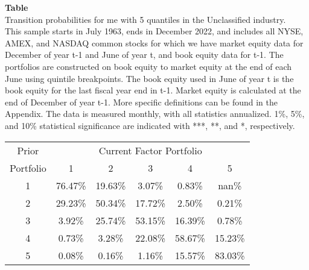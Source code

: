 \begin{table*}[ht!]
\raggedright
{}
\label{tab: transition_probs_me_Unclassified_with_5_quantiles}
\textbf{Table \thetable} \\
Transition probabilities for me with 5 quantiles in the Unclassified industry. \\
\hspace*{1em}This sample starts in July 1963, ends in December 2022, and includes all NYSE, AMEX, and NASDAQ common stocks for which we have market equity data for December of year t-1 and June of year t, and book equity data for t-1. The portfolios are constructed on book equity to market equity at the end of each June using quintile breakpoints.  The book equity used in June of year t is the book equity for the last fiscal year end in t-1.  Market equity is calculated at the end of December of year t-1.  More specific definitions can be found in the Appendix.  The data is measured monthly, with all statistics annualized.  1\%, 5\%, and 10\% statistical significance are indicated with ***, **, and *, respectively. \\
\vspace{0.5em}
\centering
\begin{adjustbox}{max width=\textwidth}
\begin{tabular}{@{}cccccc@{}}
\toprule
Prior & \multicolumn{5}{c}{Current Factor Portfolio} \\
Portfolio & 1 & 2 & 3 & 4 & 5 \\
\midrule
1 & 76.47\% & 19.63\% & 3.07\% & 0.83\% & nan\% \\
2 & 29.23\% & 50.34\% & 17.72\% & 2.50\% & 0.21\% \\
3 & 3.92\% & 25.74\% & 53.15\% & 16.39\% & 0.78\% \\
4 & 0.73\% & 3.28\% & 22.08\% & 58.67\% & 15.23\% \\
5 & 0.08\% & 0.16\% & 1.16\% & 15.57\% & 83.03\% \\
\bottomrule
\end{tabular}
\end{adjustbox}
\end{table*}